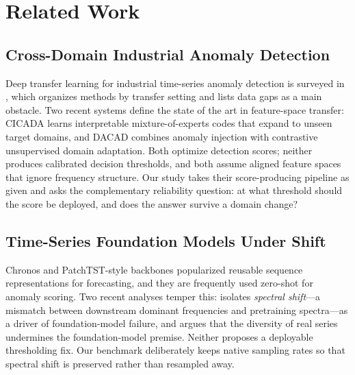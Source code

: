 \section{Related Work}
\label{sec:related}

\subsection{Cross-Domain Industrial Anomaly Detection}
Deep transfer learning for industrial time-series anomaly detection is surveyed in \cite{survey2023}, which organizes methods by transfer setting and lists data gaps as a main obstacle. Two recent systems define the state of the art in feature-space transfer: CICADA \cite{cicada2025} learns interpretable mixture-of-experts codes that expand to unseen target domains, and DACAD \cite{dacad2024} combines anomaly injection with contrastive unsupervised domain adaptation. Both optimize detection scores; neither produces calibrated decision thresholds, and both assume aligned feature spaces that ignore frequency structure. Our study takes their score-producing pipeline as given and asks the complementary reliability question: at what threshold should the score be deployed, and does the answer survive a domain change?

\subsection{Time-Series Foundation Models Under Shift}
Chronos \cite{chronos2024} and PatchTST-style backbones \cite{patchtst2023} popularized reusable sequence representations for forecasting, and they are frequently used zero-shot for anomaly scoring. Two recent analyses temper this: \cite{freqmatters2025} isolates \emph{spectral shift}---a mismatch between downstream dominant frequencies and pretraining spectra---as a driver of foundation-model failure, and \cite{foundational2025} argues that the diversity of real series undermines the foundation-model premise. Neither proposes a deployable thresholding fix. Our benchmark deliberately keeps native sampling rates so that spectral shift is preserved rather than resampled away.

